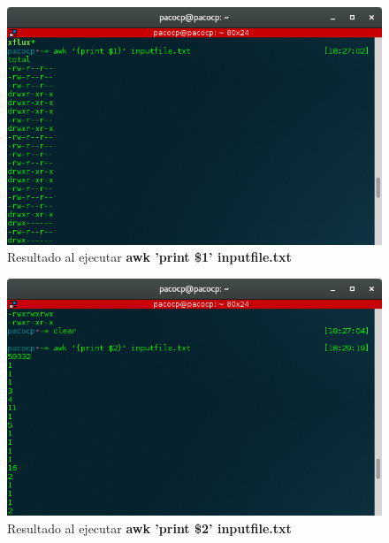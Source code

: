 \begin{figure}[H] %
	\centering
	\includegraphics[scale=0.5]{figuras/figura2.png}  %
	
	
	\caption{Resultado al ejecutar \textbf{awk '{print \$1}' inputfile.txt}}
	\label{figura2}
\end{figure}

\begin{figure}[H] %
	\centering
	\includegraphics[scale=0.5]{figuras/figura3.png}  %
	
	
	\caption{Resultado al ejecutar \textbf{awk '{print \$2}' inputfile.txt}}
	\label{figura3}
\end{figure}

